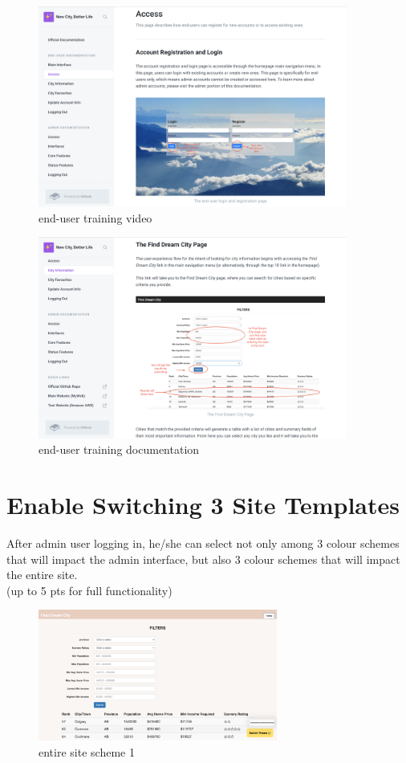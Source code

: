 \documentclass[12pt, letterpaper]{article}
\begin{document}
 \begin{figure}[htbp]
	\centering
	\includegraphics[width=4in]{images/q13.png}
	\caption{end-user training video}
 \end{figure}
 
 \begin{figure}[htbp]
	\centering
	\includegraphics[width=4in]{images/q13-2.png}
	\caption{end-user training documentation}
 \end{figure}
 
 \newpage

\section{Enable Switching 3 Site Templates}
After admin user logging in, he/she can select not only among 3 colour schemes that will impact the admin interface, but also 3 colour schemes that will impact the entire site. 
\\(up to 5 pts for full functionality)

\begin{figure}[htbp]
	\centering
	\includegraphics[width=3.1in]{images/q14-1.png}
	\caption{entire site scheme 1}
 \end{figure}
 
\end{document}
